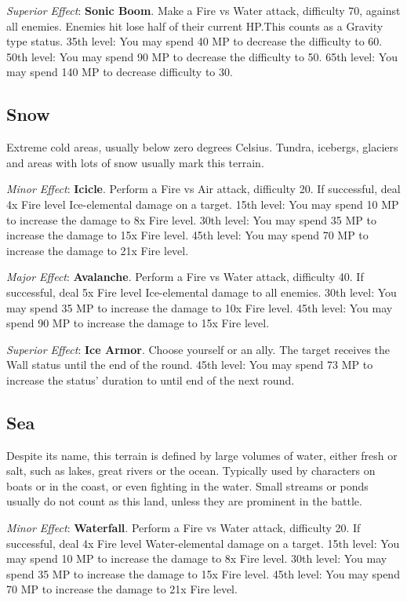 \begin{multicols}{2}
\textit{Superior Effect}: \textbf{Sonic Boom}. Make a Fire vs Water attack, difficulty 70, against all enemies. Enemies hit lose half of their current HP.\@{}This counts as a Gravity type status. 35th level: You may spend 40 MP to decrease the difficulty to 60. 50th level: You may spend 90 MP to decrease the difficulty to 50. 65th level: You may spend 140 MP to decrease difficulty to 30.

\subsection*{Snow}\label{subsec:geo-snow}
Extreme cold areas, usually below zero degrees Celsius. Tundra, icebergs, glaciers and areas with lots of snow usually mark this terrain.

\textit{Minor Effect}: \textbf{Icicle}. Perform a Fire vs Air attack, difficulty 20. If successful, deal 4x Fire level Ice-elemental damage on a target. 15th level: You may spend 10 MP to increase the damage to 8x Fire level. 30th level: You may spend 35 MP to increase the damage to 15x Fire level. 45th level: You may spend 70 MP to increase the damage to 21x Fire level.

\textit{Major Effect}: \textbf{Avalanche}. Perform a Fire vs Water attack, difficulty 40. If successful, deal 5x Fire level Ice-elemental damage to all enemies. 30th level: You may spend 35 MP to increase the damage to 10x Fire level. 45th level: You may spend 90 MP to increase the damage to 15x Fire level.

\textit{Superior Effect}: \textbf{Ice Armor}. Choose yourself or an ally. The target receives the Wall status until the end of the round. 45th level: You may spend 73 MP to increase the status’ duration to until end of the next round.

\subsection*{Sea}\label{subsec:geo-sea}
Despite its name, this terrain is defined by large volumes of water, either fresh or salt, such as lakes, great rivers or the ocean. Typically used by characters on boats or in the coast, or even fighting in the water. Small streams or ponds usually do not count as this land, unless they are prominent in the battle.

\textit{Minor Effect}: \textbf{Waterfall}. Perform a Fire vs Water attack, difficulty 20. If successful, deal 4x Fire level Water-elemental damage on a target. 15th level: You may spend 10 MP to increase the damage to 8x Fire level. 30th level: You may spend 35 MP to increase the damage to 15x Fire level. 45th level: You may spend 70 MP to increase the damage to 21x Fire level.


\end{multicols}
